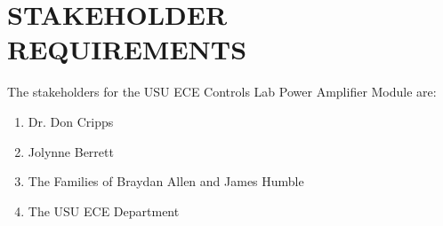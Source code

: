 \section{STAKEHOLDER REQUIREMENTS} %

%
%

The stakeholders for the USU ECE Controls Lab Power Amplifier Module are:

\begin{enumerate}
	\item Dr. Don Cripps
	\item Jolynne Berrett
	\item The Families of Braydan Allen and James Humble
	\item The USU ECE Department
\end{enumerate}


